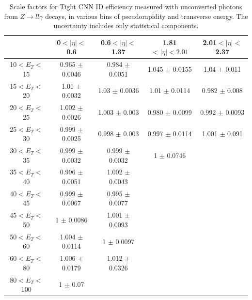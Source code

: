 \begin{table}[htbp]
    \centering
   \begin{tabular}{ccccc}
   \hline\hline
     & 0$<|\eta|<$0.6 & 0.6$<|\eta|<$1.37 & 1.81$<|\eta|<2.01$  & 2.01$<|\eta|<$2.37 \\
    \hline
10$<E_T<$15   & 0.965 $\pm$ 0.0046 & 0.984 $\pm$ 0.0051 & 1.045 $\pm$ 0.0155 & 1.04 $\pm$ 0.011\\
15$<E_T<$20   & 1.01 $\pm$  0.0032 & 1.03 $\pm$ 0.0036  & 1.01 $\pm$ 0.0114 & 0.982 $\pm$ 0.008 \\
20$<E_T<$25   & 1.002 $\pm$ 0.0026 & 1.003 $\pm$ 0.003  & 0.980 $\pm$ 0.0099 & 0.992 $\pm$ 0.0093\\
25$<E_T<$30   & 0.999 $\pm$ 0.0025 & 0.998 $\pm$ 0.003  & 0.997 $\pm$ 0.0114 & 1.001 $\pm$ 0.091\\
30$<E_T<$35   & 0.999 $\pm$ 0.0032 & 0.999 $\pm$ 0.0032 & 1     $\pm$ 0.0746 & \\
35$<E_T<$40   & 0.996 $\pm$ 0.0051 & 1.002 $\pm$ 0.0043 &                    & \\
40$<E_T<$45   & 0.999 $\pm$ 0.0067 & 0.995 $\pm$ 0.0077 &                    & \\
45$<E_T<$50   & 1     $\pm$ 0.0086 & 1.001 $\pm$ 0.0093 &                    & \\
50$<E_T<$60   & 1.004 $\pm$ 0.0114 & 1     $\pm$ 0.0097 &                    & \\
60$<E_T<$80   & 1.006 $\pm$ 0.0179 & 1.012 $\pm$ 0.0326 &                    & \\
80$<E_T<$100  & 1     $\pm$ 0.07   &                    &                    & \\
\hline\hline
\end{tabular}
\begin{tcolorbox}[colback=black!5!white,colframe=white!75!black]
\caption{Scale factors for Tight CNN ID efficiency measured with unconverted photons from $Z\rightarrow ll\gamma$ decays, in various bins of pseudorapidity and transverse energy. The uncertainty includes only statistical components.}
\label{tab:gamma:CNN:Zllg:SF:UnC}
\end{tcolorbox}

\end{table}

